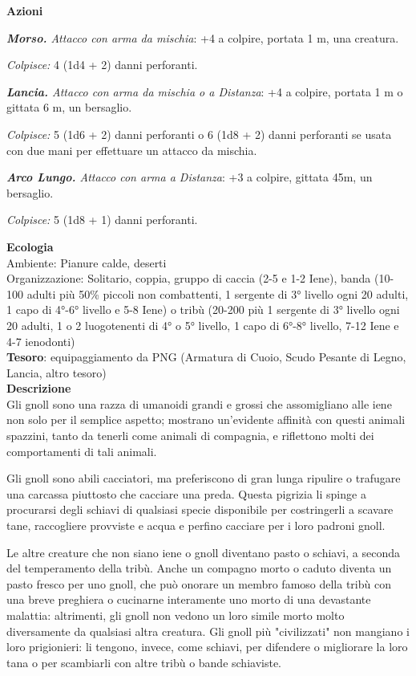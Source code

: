 \begin{multicols}{2}
\textbf{Azioni}

\textit{\textbf{Morso.} Attacco con arma da mischia}: +4 a colpire, portata 1 m, una creatura.

\textit{Colpisce:} 4 (1d4 + 2) danni perforanti.

\textit{\textbf{Lancia.} Attacco con arma da mischia o a Distanza}: +4 a colpire, portata 1 m o gittata 6 m, un bersaglio.

\textit{Colpisce:} 5 (1d6 + 2) danni perforanti o 6 (1d8 + 2) danni perforanti se usata con due mani per effettuare un attacco da mischia.

\textit{\textbf{Arco Lungo.} Attacco con arma a Distanza}: +3 a colpire, gittata 45m, un bersaglio.

\textit{Colpisce:} 5 (1d8 + 1) danni perforanti.

\textbf{Ecologia}\\
Ambiente: Pianure calde, deserti\\
Organizzazione: Solitario, coppia, gruppo di caccia (2-5 e 1-2 Iene), banda (10-100 adulti più 50\% piccoli non combattenti, 1 sergente di 3° livello ogni 20 adulti, 1 capo di 4°-6° livello e 5-8 Iene) o tribù (20-200 più 1 sergente di 3° livello ogni 20 adulti, 1 o 2 luogotenenti di 4° o 5° livello, 1 capo di 6°-8° livello, 7-12 Iene e 4-7 ienodonti)\\
\textbf{Tesoro}: equipaggiamento da PNG (Armatura di Cuoio, Scudo Pesante di Legno, Lancia, altro tesoro)\\
\textbf{Descrizione}\\
Gli gnoll sono una razza di umanoidi grandi e grossi che assomigliano alle iene non solo per il semplice aspetto; mostrano un'evidente affinità con questi animali spazzini, tanto da tenerli come animali di compagnia, e riflettono molti dei comportamenti di tali animali.

Gli gnoll sono abili cacciatori, ma preferiscono di gran lunga ripulire o trafugare una carcassa piuttosto che cacciare una preda. Questa pigrizia li spinge a procurarsi degli schiavi di qualsiasi specie disponibile per costringerli a scavare tane, raccogliere provviste e acqua e perfino cacciare per i loro padroni gnoll.

Le altre creature che non siano iene o gnoll diventano pasto o schiavi, a seconda del temperamento della tribù. Anche un compagno morto o caduto diventa un pasto fresco per uno gnoll, che può onorare un membro famoso della tribù con una breve preghiera o cucinarne interamente uno morto di una devastante malattia: altrimenti, gli gnoll non vedono un loro simile morto molto diversamente da qualsiasi altra creatura. Gli gnoll più "civilizzati" non mangiano i loro prigionieri: li tengono, invece, come schiavi, per difendere o migliorare la loro tana o per scambiarli con altre tribù o bande schiaviste.


\end{multicols}
